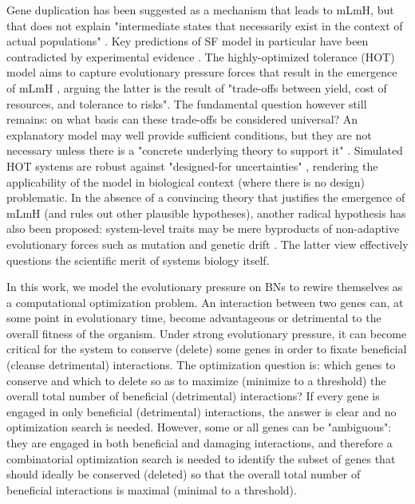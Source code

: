 Gene duplication has been suggested \cite{vazquez_modeling_2002, bhan_duplication_2002} as a mechanism that leads to mLmH, but that does not explain
"intermediate states that necessarily exist in the context of actual populations" \cite{lynch_evolution_2007}.
Key predictions of SF model in particular have been contradicted by experimental evidence \cite{hahn_molecular_2004,fraser_evolutionary_2002}. The highly-optimized tolerance (HOT) model aims to capture evolutionary pressure forces that result in the emergence of mLmH \cite{carlson_highly_1999}, arguing the latter is the result of "trade-offs between yield, cost of resources, and tolerance to risks". The fundamental question however still remains: on what basis can these trade-offs be considered universal? An explanatory model may well provide sufficient conditions, but they are not necessary unless there is a "concrete underlying theory to support it" \cite{stumpf_critical_2012}.  Simulated HOT systems  are robust against "designed-for uncertainties" \cite{carlson_highly_1999},  rendering  the applicability of the model in biological context (where there is no design) problematic. 
%
In the absence of a convincing theory that justifies the emergence of mLmH (and rules out other plausible hypotheses), another radical hypothesis has also been proposed: 
system-level traits may be mere byproducts of non-adaptive evolutionary forces such as mutation and genetic drift \cite{lynch_frailty_2007, papp_critical_2009, sorrells_making_2015}. The 
latter view effectively questions the scientific merit of systems biology itself. 

In this work, we model the evolutionary pressure on BNs to rewire themselves as a computational optimization problem. 
An interaction between two genes can, at some point in evolutionary time, become advantageous or detrimental to the overall
fitness of the organism. Under strong evolutionary pressure, it can become critical for the system to conserve (delete)
some genes in order to fixate beneficial (cleanse detrimental) interactions. The optimization question is: which genes to conserve and 
which to delete so as to maximize (minimize to a threshold) the overall total number of beneficial (detrimental) interactions?
If every gene is engaged  in only beneficial (detrimental)
interactions, the answer is clear and no optimization search is needed. 
However,  some or all genes  can be "ambiguous": they are engaged in both beneficial and damaging
interactions, and therefore a combinatorial optimization search is needed to identify the subset of genes that should ideally be conserved (deleted)
so that the overall total number of beneficial interactions is maximal (minimal to a threshold).  

